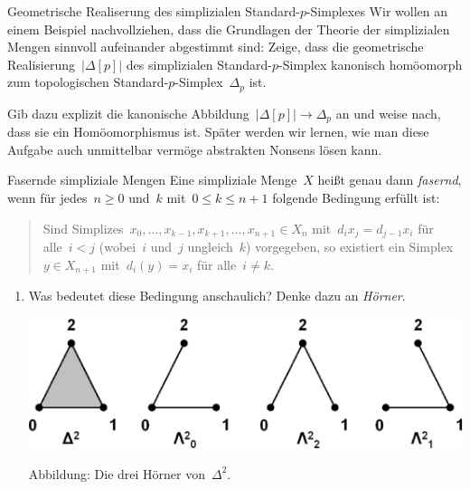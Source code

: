 \documentclass{uebblatt}
\begin{document}

\begin{aufgabe}{Geometrische Realiserung des simplizialen
Standard-$p$-Simplexes}
Wir wollen an einem Beispiel nachvollziehen, dass die Grundlagen
der Theorie der simplizialen Mengen sinnvoll aufeinander abgestimmt sind:
Zeige, dass die geometrische Realisierung~$|\Delta[p]|$ des simplizialen
Standard-$p$-Simplex kanonisch homöomorph zum topologischen
Standard-$p$-Simplex~$\Delta_p$ ist.

Gib dazu explizit die kanonische Abbildung~$|\Delta[p]| \to \Delta_p$ an und
weise nach, dass sie ein Homöomorphismus ist. Später werden wir lernen, wie man
diese Aufgabe auch unmittelbar vermöge abstrakten Nonsens lösen kann.
\end{aufgabe}

\begin{aufgabe}{Fasernde simpliziale Mengen}
Eine simpliziale Menge~$X$ heißt genau dann \emph{fasernd}, wenn für jedes~$n
\geq 0$ und~$k$ mit~$0 \leq k \leq n + 1$ folgende Bedingung erfüllt ist:
\begin{quote}Sind Simplizes~$x_0,\ldots,x_{k-1},x_{k+1},\ldots,x_{n+1} \in X_n$
mit~$d_i x_j = d_{j-1} x_i$ für alle~$i < j$ (wobei~$i$ und~$j$ ungleich~$k$)
vorgegeben, so existiert ein Simplex~$y \in X_{n+1}$ mit~$d_i(y) = x_i$ für
alle~$i \neq k$.
\end{quote}
\begin{enumerate}
\item Was bedeutet diese Bedingung anschaulich? Denke dazu an \emph{Hörner}.
\begin{center}
\includegraphics[scale=0.5]{hoerner}

Abbildung: Die drei Hörner von~$\Delta^2$.
\end{center}
\end{enumerate}
\end{aufgabe}
\end{document}
